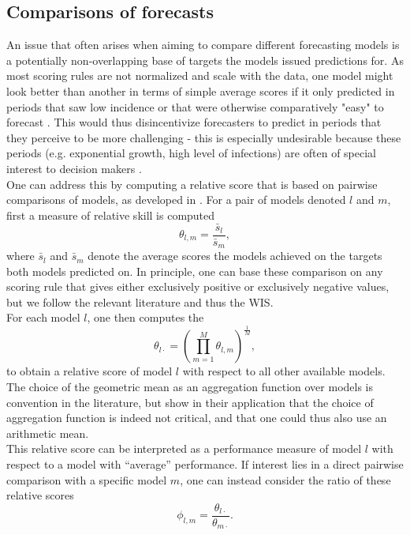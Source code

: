 \subsection{Comparisons of forecasts} \label{sub:pairwise_comps}
An issue that often arises when aiming to compare different forecasting models is a potentially non-overlapping base of targets the models issued predictions for. As most scoring rules are not normalized and scale with the data, %
one model might look better than another in terms of simple average scores if it only predicted in periods that saw low incidence or that were otherwise comparatively "easy" to forecast \cite{cramer_evaluation_2022}. This would thus disincentivize forecasters to predict in periods that they perceive to be more challenging - this is especially undesirable because these periods (e.g. exponential growth, high level of infections) are often of special interest to decision makers .\\
One can address this by computing a relative score that is based on pairwise comparisons of models, as developed in \cite{cramer_evaluation_2022}. For a pair of models denoted $l$ and $m$, first a measure of relative skill is computed
\[
\theta_{l,m} = \frac{\bar{s}_{l}}{\bar{s}_{m}},
\]
where $\bar{s}_{l}$ and $\bar{s}_{m}$ denote the average scores the models achieved on the targets both models predicted on. In principle, one can base these comparison on any scoring rule that gives either exclusively positive or exclusively negative values, but we follow the relevant literature and thus the WIS.\\
For each model $l$, one then computes the 
\[
\theta_{l\cdot} = \left(\prod_{m = 1}^{M}\theta_{l,m} \right)^{\frac{1}{M}},
\]to obtain a relative score of model $l$ with respect to all other available models. The choice of the geometric mean as an aggregation function over models is convention in the literature, but \cite{ray_comparing_2022} show in their application that the choice of aggregation function is indeed not critical, and that one could thus also use an arithmetic mean. \\
This relative score can be interpreted as a performance measure of model $l$ with respect to a model with ``average'' performance. If interest lies in a direct pairwise comparison with a specific model $m$, one can instead consider the ratio of these relative scores
\begin{equation} \label{eq:mean_score_ratio}
\phi_{l,m} = \frac{\theta_{l\cdot}}{\theta_{m\cdot}}. 
\end{equation}

